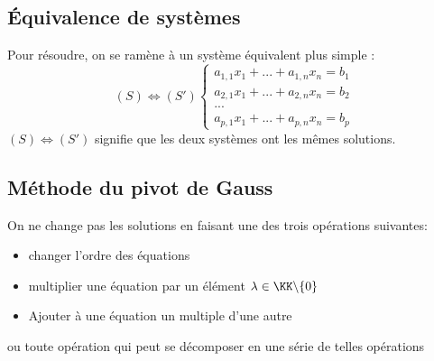\documentclass[../main.tex]{subfile}
\begin{document}
\subsection{\'Equivalence de systèmes}
Pour résoudre, on se ramène à un système équivalent plus simple :
$$
(S) \Leftrightarrow (S') 
	\left\{
	\begin{array}{l}
		a_{1,1}x_1 + ... + a_{1,n}x_n = b_1\\
		a_{2,1}x_1 + ... + a_{2,n}x_n = b_2\\
		...\\
		a_{p,1}x_1 + ... + a_{p,n}x_n = b_p
	\end{array}
	\right.
$$
$(S) \Leftrightarrow (S')$ signifie que les deux systèmes ont les mêmes solutions.

\subsection{Méthode du pivot de Gauss}
On ne change pas les solutions en faisant une des trois opérations suivantes:
\begin{itemize}
	\item changer l'ordre des équations
	\item multiplier une équation par un élément $\lambda \in \KK \backslash \{0\}$
	\item Ajouter à une équation un multiple d'une autre
\end{itemize}
ou toute opération qui peut se décomposer en une série de telles opérations
\end{document}
